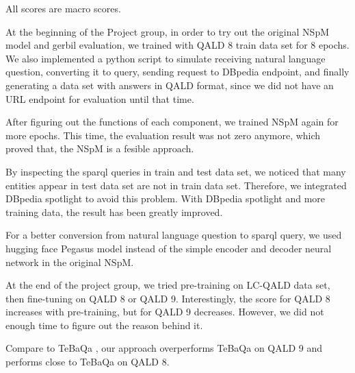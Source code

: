 All scores are macro scores. 

At the beginning of the Project group,
in order to try out the original NSpM model and gerbil evaluation,
we trained with QALD 8 train data set for 8 epochs. 
We also implemented a python script to simulate 
receiving natural language question, 
converting it to query,
sending request to DBpedia endpoint, 
and finally generating a data set with answers in QALD format,
since we did not have an URL endpoint for evaluation until that time. 

After figuring out the functions of each component, 
we trained NSpM again for more epochs. 
This time, the evaluation result was not zero anymore, 
which proved that,
the NSpM is a fesible approach. 

By inspecting the sparql queries in train and test data set, 
we noticed that
many entities appear in test data set are not in train data set. 
Therefore, we integrated DBpedia spotlight to avoid this problem. 
With DBpedia spotlight and more training data, 
the result has been greatly improved. 

For a better conversion from natural language question to sparql query, 
we used hugging face Pegasus model instead of the simple encoder and decoder neural network in the original NSpM.

At the end of the project group, we tried pre-training on LC-QALD data set, then fine-tuning on QALD 8 or QALD 9. 
Interestingly, the score for QALD 8 increases with pre-training, 
but for QALD 9 decreases. 
However, we did not enough time to figure out the reason behind it. 

Compare to TeBaQa \cite{DBLP:journals/corr/abs-2103-06752},
our approach overperforms TeBaQa on QALD 9 and performs close to TeBaQa on QALD 8.